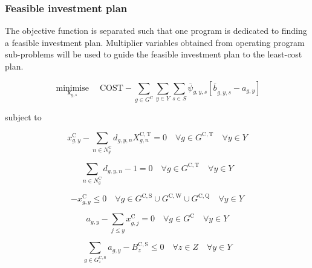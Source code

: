 \documentclass{article}
\newcommand{\sGeneratorsCandidate}{G^{\mathrm{C}}}
\newcommand{\sGeneratorsCandidateThermal}{G^{\mathrm{C,T}}}
\newcommand{\sGeneratorsCandidateWind}{G^{\mathrm{C,W}}}
\newcommand{\sGeneratorsCandidateSolar}{G^{\mathrm{C,S}}}
\newcommand{\sStorageCandidate}{G^{\mathrm{C,Q}}}
\newcommand{\sYears}{Y}
\newcommand{\sScenarios}{S}
\newcommand{\sZones}{Z}
\newcommand{\sInvestmentSizeOptions}{N^{\mathrm{C}}}
\newcommand{\sInvestmentSizeOptionsGenerator}[1][\iGenerator]{\sInvestmentSizeOptions_{#1}}
\newcommand{\iGenerator}{g}
\newcommand{\iYear}{y}
\newcommand{\iYearAlias}{j}
\newcommand{\iScenario}{s}
\newcommand{\iZone}{z}
\newcommand{\iInvestmentSizeOption}{n}
\newcommand{\cInvestmentSize}{X^{\mathrm{C,T}}_{\iGenerator,\iInvestmentSizeOption}}
\newcommand{\cBuildLimit}[1][]{B^{\mathrm{C,#1}}_{\iZone}}
\newcommand{\cObjectiveFunction}{\mathrm{COST}}
\newcommand{\vInstalledCapacity}[1][\iGenerator,\iYear]{x^{\mathrm{C}}_{#1}}
\newcommand{\vInvestmentSizeIndicator}[1][\iGenerator,\iYear,\iInvestmentSizeOption]{d_{#1}}
\newcommand{\vInstalledCapacityTotal}[1][\iGenerator,\iYear]{a_{#1}}
\newcommand{\vInstalledCapacityTotalScenario}[1][\iGenerator,\iYear,\iScenario]{b_{#1}}
\DeclareMathOperator*{\minimise}{minimise}
\begin{document}
\subsubsection{Feasible investment plan}
The objective function is separated such that one program is dedicated to finding a feasible investment plan. Multiplier variables obtained from operating program sub-problems will be used to guide the feasible investment plan to the least-cost plan.

\begin{equation}
\minimise\limits_{\bm{x}_{\iYear,\iScenario}} \quad \cObjectiveFunction - \sum\limits_{\iGenerator \in \sGeneratorsCandidate}\sum\limits_{\iYear \in \sYears}\sum\limits_{\iScenario \in \sScenarios} \overline{\psi}_{\iGenerator,\iYear,\iScenario}\left[\overline{\vInstalledCapacityTotalScenario[]}_{\iGenerator,\iYear,\iScenario} - \vInstalledCapacityTotal\right]
\end{equation}

subject to

\begin{equation}
\vInstalledCapacity - \sum\limits_{\iInvestmentSizeOption \in \sInvestmentSizeOptionsGenerator} \vInvestmentSizeIndicator \cInvestmentSize = 0 \quad \forall \iGenerator \in \sGeneratorsCandidateThermal \quad \forall \iYear \in \sYears 
\end{equation}

\begin{equation}
\sum\limits_{\iInvestmentSizeOption \in \sInvestmentSizeOptionsGenerator} \vInvestmentSizeIndicator - 1 = 0 \quad \forall \iGenerator \in \sGeneratorsCandidateThermal \quad \forall \iYear \in \sYears
\end{equation}

\begin{equation}
- \vInstalledCapacity[\iGenerator,\iYear] \leq 0 \quad \forall \iGenerator \in \sGeneratorsCandidateSolar \cup \sGeneratorsCandidateWind \cup \sStorageCandidate \quad \forall \iYear \in \sYears
\end{equation}

\begin{equation}
\vInstalledCapacityTotal - \sum\limits_{\iYearAlias \leq \iYear} \vInstalledCapacity[\iGenerator,\iYearAlias] = 0 \quad \forall \iGenerator \in \sGeneratorsCandidate \quad \forall \iYear \in \sYears
\end{equation}

\begin{equation}
\sum\limits_{\iGenerator \in \sGeneratorsCandidateSolar_{\iZone}} \vInstalledCapacityTotal - \cBuildLimit[S] \leq 0 \quad \forall \iZone \in \sZones \quad \forall \iYear \in \sYears
\end{equation}
\end{document}
